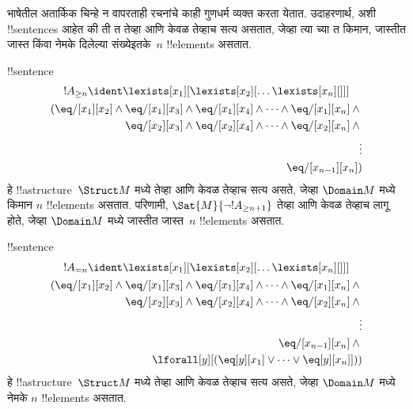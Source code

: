 \documentclass[../../../include/open-logic-section]{subfiles}
\begin{document}


\begin{explain}
भाषेतील अतार्किक चिन्हे न वापरताही रचनांचे काही गुणधर्म व्यक्त करता येतात.
उदाहरणार्थ, अशी !!{sentence}s आहेत की ती त तेव्हा आणि केवळ
तेव्हाच सत्य असतात, जेव्हा त्या च्या त
किमान, जास्तीत जास्त किंवा नेमके दिलेल्या संख्येइतके~$n$ !!{element}s असतात.
\end{explain}

\begin{prop}
!!{sentence}
\begin{multline*}
  !A_{\ge n} \ident \lexists[x_1][\lexists[x_2][\dots\lexists[x_n][{}]]]\\
  \begin{aligned}
  (\eq/[x_1][x_2] \land {}
  \eq/[x_1][x_3] \land \eq/[x_1][x_4] \land \dots \land \eq/[x_1][x_n] \land {}\\
\eq/[x_2][x_3] \land \eq/[x_2][x_4] \land \dots \land {} \eq/[x_2][x_n] \land {} \\
\vdots\\
\eq/[x_{n-1}][x_n])
\end{aligned}
\end{multline*}
हे !!a{structure}~$\Struct M$ मध्ये तेव्हा आणि केवळ तेव्हाच सत्य असते,
जेव्हा $\Domain M$ मध्ये किमान $n$ !!{element}s असतात. परिणामी,
$\Sat{M}{\lnot !A_{\ge n+1}}$ तेव्हा आणि केवळ तेव्हाच लागू होते, जेव्हा
$\Domain M$ मध्ये जास्तीत जास्त~$n$ !!{element}s असतात.

\end{prop}

\begin{prop}
!!{sentence}
\begin{multline*}
!A_{= n} \ident \lexists[x_1][\lexists[x_2][\dots\lexists[x_n][{}]]] \\
\begin{aligned}
  (\eq/[x_1][x_2] \land {}
  \eq/[x_1][x_3] \land \eq/[x_1][x_4] \land \dots \land \eq/[x_1][x_n] \land {}\\
\eq/[x_2][x_3] \land \eq/[x_2][x_4] \land \dots \land {} \eq/[x_2][x_n] \land {} \\
\vdots\\
\eq/[x_{n-1}][x_n] \land {} \\
\lforall[y][(\eq[y][x_1] \lor \dots \lor \eq[y][x_n]]))
\end{aligned}
\end{multline*}
हे !!a{structure}~$\Struct M$ मध्ये तेव्हा आणि केवळ तेव्हाच सत्य असते,
जेव्हा $\Domain M$ मध्ये नेमके $n$ !!{element}s असतात.
\end{prop}
\end{document}
